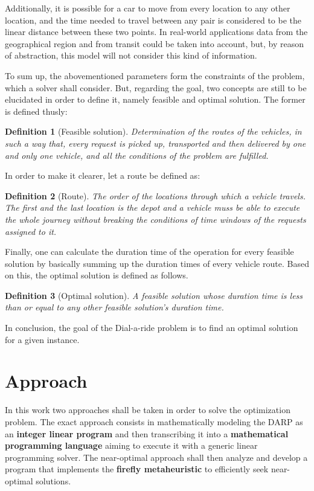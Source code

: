 \documentclass[tuberlin,cic,tc,openright,english,noabntcite,oneside]{iiufrgs}
\newtheorem{definition}{Definition}
\begin{document}
Additionally, it is possible for a car to move from every location to any other location, and the time needed to travel between any pair is considered to be the linear distance between these two points. In real-world applications data from the geographical region and from transit could be taken into account, but, by reason of abstraction, this model will not consider this kind of information.

To sum up, the abovementioned parameters form the constraints of the problem, which a solver shall consider. But, regarding the goal, two concepts are still to be elucidated in order to define it, namely feasible and optimal solution. The former is defined thusly:
\begin{definition}[Feasible solution]
Determination of the routes of the vehicles, in such a way that, every request is picked up, transported and then delivered by one and only one vehicle, and all the conditions of the problem are fulfilled.
\end{definition}

In order to make it clearer, let a route be defined as:
\begin{definition}[Route]
The order of the locations through which a vehicle travels. The first and the last location is the depot and a vehicle muss be able to execute the whole journey without breaking the conditions of time windows of the requests assigned to it.
\end{definition}

Finally, one can calculate the duration time of the operation for every feasible solution by basically summing up the duration times of every vehicle route. Based on this, the optimal solution is defined as follows.
\begin{definition}[Optimal solution]
A feasible solution whose duration time is less than or equal to any other feasible solution's duration time.
\end{definition}

In conclusion, the goal of the Dial-a-ride problem is to find an optimal solution for a given instance.

\section{Approach}
In this work two approaches shall be taken in order to solve the optimization problem. The exact approach consists in mathematically modeling the DARP as an \textbf{integer linear program} and then transcribing it into a \textbf{mathematical programming language} aiming to execute it with a generic linear programming solver. The near-optimal approach shall then analyze and develop a program that implements the \textbf{firefly metaheuristic} to efficiently seek near-optimal solutions.
\end{document}
